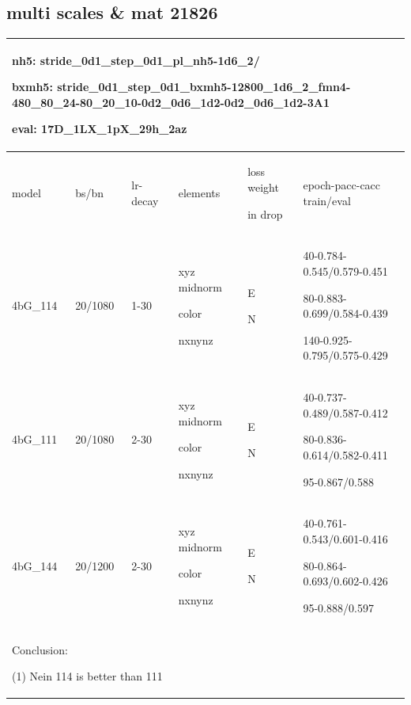 \documentclass[,table,dvipsnames]{article}
\begin{document}
\subsection{multi scales \& mat 21826}
\begin{tabular}{|p{1.5cm}|p{1.5cm}|p{1cm}|p{2cm}|p{1.5cm}|p{6cm}| }
	\hline
	\multicolumn{6}{|p{12cm}|}{nh5: stride\_0d1\_step\_0d1\_pl\_nh5-1d6\_2/ \par bxmh5:  stride\_0d1\_step\_0d1\_bxmh5-12800\_1d6\_2\_fmn4-480\_80\_24-80\_20\_10-0d2\_0d6\_1d2-0d2\_0d6\_1d2-3A1 \par eval: 17D\_1LX\_1pX\_29h\_2az } \\
	\hline
	model & bs/bn& lr-decay & elements & loss weight\par in drop & epoch-pacc-cacc train/eval \\
	\hline
	4bG\_114 & 20/1080 &1-30 & xyz midnorm\par color\par nxnynz & E\par N &40-0.784-0.545/0.579-0.451 \par 80-0.883-0.699/0.584-0.439 \par 140-0.925-0.795/0.575-0.429 \\
	\hline
	4bG\_111 & 20/1080 &2-30 & xyz midnorm\par color\par nxnynz & E\par N &40-0.737-0.489/0.587-0.412\par 80-0.836-0.614/0.582-0.411 \par 95-0.867/0.588 \\
	\hline 
	4bG\_144 & 20/1200 &2-30 & xyz midnorm\par color\par nxnynz & E\par N &40-0.761-0.543/0.601-0.416\par 80-0.864-0.693/0.602-0.426 \par 95-0.888/0.597 \\
	\hline
	 
	\multicolumn{6}{|p{12cm}|}{ Conclusion:\par	(1) Nein 114 is better than 111  } \\
	\hline
\end{tabular}	
\end{document}
